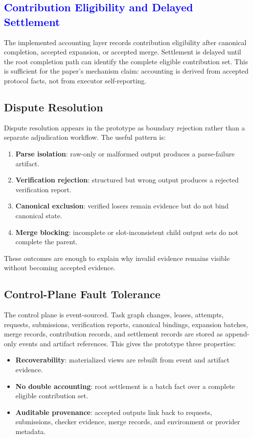 \documentclass{article}
\theoremstyle{plain}
\begin{document}
\subsection{\textcolor{blue}{Contribution Eligibility and Delayed Settlement}}

{\color{blue}
The implemented accounting layer records contribution eligibility after canonical completion, accepted expansion, or accepted merge. Settlement is delayed until the root completion path can identify the complete eligible contribution set. This is sufficient for the paper's mechanism claim: accounting is derived from accepted protocol facts, not from executor self-reporting.
}

\subsection{Dispute Resolution}

{\color{blue}
Dispute resolution appears in the prototype as boundary rejection rather than a separate adjudication workflow. The useful pattern is:
\begin{enumerate}
\item \textbf{Parse isolation}: raw-only or malformed output produces a parse-failure artifact.
\item \textbf{Verification rejection}: structured but wrong output produces a rejected verification report.
\item \textbf{Canonical exclusion}: verified losers remain evidence but do not bind canonical state.
\item \textbf{Merge blocking}: incomplete or slot-inconsistent child output sets do not complete the parent.
\end{enumerate}
These outcomes are enough to explain why invalid evidence remains visible without becoming accepted evidence.
}

\subsection{Control-Plane Fault Tolerance}

{\color{blue}
The control plane is event-sourced. Task graph changes, leases, attempts, requests, submissions, verification reports, canonical bindings, expansion batches, merge records, contribution records, and settlement records are stored as append-only events and artifact references. This gives the prototype three properties:
\begin{itemize}
\item \textbf{Recoverability}: materialized views are rebuilt from event and artifact evidence.
\item \textbf{No double accounting}: root settlement is a batch fact over a complete eligible contribution set.
\item \textbf{Auditable provenance}: accepted outputs link back to requests, submissions, checker evidence, merge records, and environment or provider metadata.
\end{itemize}
}
\end{document}

